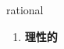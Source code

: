 
\begin{frame}
{\huge rational}
\begin{center}
\begin{enumerate}\Large
  \item \textbf{理性的}
\end{enumerate}
\end{center}
\end{frame}
